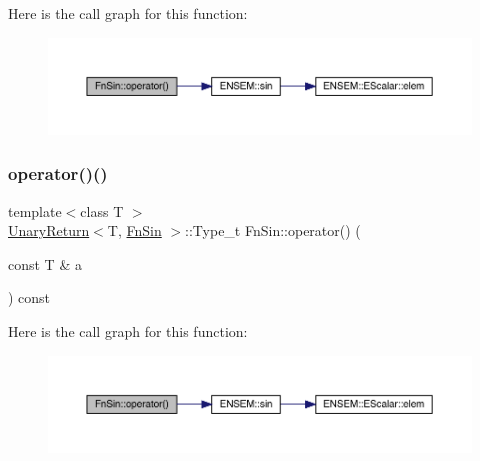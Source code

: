 Here is the call graph for this function\+:
\nopagebreak
\begin{figure}[H]
\begin{center}
\leavevmode
\includegraphics[width=350pt]{d6/d10/structFnSin_a6aa1709fd8bbba5ccb5a3cba4c5ad601_cgraph}
\end{center}
\end{figure}
\mbox{\label{structFnSin_a6aa1709fd8bbba5ccb5a3cba4c5ad601}} 
\subsubsection{\texorpdfstring{operator()()}{operator()()}\hspace{0.1cm}{\footnotesize\ttfamily [2/3]}}
{\footnotesize\ttfamily template$<$class T $>$ \\
\mbox{\hyperlink{structUnaryReturn}{Unary\+Return}}$<$T, \mbox{\hyperlink{structFnSin}{Fn\+Sin}} $>$\+::Type\+\_\+t Fn\+Sin\+::operator() (\begin{DoxyParamCaption}\item[{const T \&}]{a }\end{DoxyParamCaption}) const\hspace{0.3cm}{\ttfamily [inline]}}

Here is the call graph for this function\+:
\nopagebreak
\begin{figure}[H]
\begin{center}
\leavevmode
\includegraphics[width=350pt]{d6/d10/structFnSin_a6aa1709fd8bbba5ccb5a3cba4c5ad601_cgraph}
\end{center}
\end{figure}
\mbox{\label{structFnSin_a6aa1709fd8bbba5ccb5a3cba4c5ad601}} 
